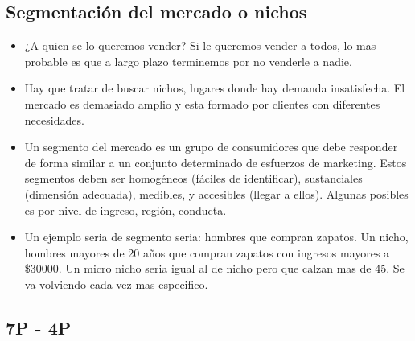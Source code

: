 \documentclass[titlepage,a4paper]{article}
\begin{document}
\subsection{Segmentación del mercado o nichos}
\begin{itemize}
\item ¿A quien se lo queremos vender? Si le queremos vender a todos, lo mas probable es que a largo plazo terminemos por no venderle a nadie.
\item Hay que tratar de buscar nichos, lugares donde hay demanda insatisfecha. El mercado es demasiado amplio y esta formado por clientes con diferentes necesidades.
\item Un segmento del mercado es un grupo de consumidores que debe responder de forma similar a un conjunto determinado de esfuerzos de marketing. Estos segmentos deben ser homogéneos (fáciles de identificar), sustanciales (dimensión adecuada), medibles, y accesibles (llegar a ellos). Algunas posibles es por nivel de ingreso, región, conducta. 
\item Un ejemplo seria de segmento seria: hombres que compran zapatos. Un nicho, hombres mayores de 20 años que compran zapatos con ingresos mayores a \$30000. Un micro nicho seria igual al de nicho pero que calzan mas de 45. Se va volviendo cada vez mas especifico.
\end{itemize}


\subsection{7P - 4P}
\end{document}
